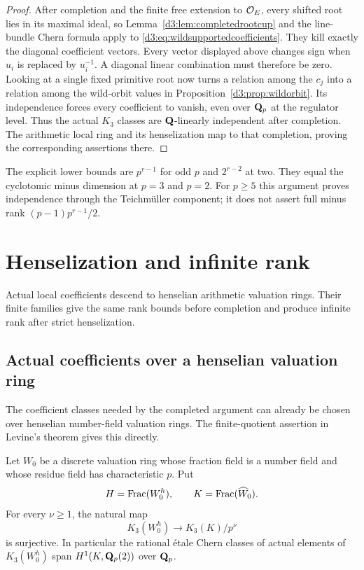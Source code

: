 \begin{proof}
After completion and the finite free extension to
$\mathcal O_E$, every shifted root lies in its maximal ideal, so
Lemma~\ref{d3:lem:completedrootcup} and the line-bundle Chern formula
apply to \eqref{d3:eq:wildsupportedcoefficients}.
They kill exactly the diagonal coefficient vectors.
Every vector displayed above changes sign when $u_i$ is replaced
by $u_i^{-1}$. A diagonal linear combination must therefore be zero.
Looking at a single fixed primitive root now turns a relation
among the $c_j$ into a relation among the wild-orbit values in
Proposition~\ref{d3:prop:wildorbit}. Its independence forces every
coefficient to vanish, even over $\mathbf Q_p$ at the regulator level.
Thus the actual $K_3$ classes are $\mathbf Q$-linearly independent after
completion. The arithmetic local ring and its henselization map
to that completion, proving the corresponding assertions there.
\end{proof}

\begin{remark}
The explicit lower bounds are $p^{r-1}$ for odd $p$ and
$2^{r-2}$ at two. They equal the cyclotomic minus dimension at
$p=3$ and $p=2$. For $p\geq5$ this argument proves independence
through the Teichm\"uller component; it does not assert full minus
rank $(p-1)p^{r-1}/2$.
\end{remark}


\section{Henselization and infinite rank}\label{d3:sec:henselian}
Actual local coefficients descend to henselian arithmetic valuation rings.
Their finite families give the same rank bounds before completion and
produce infinite rank after strict henselization.

\subsection{Actual coefficients over a henselian valuation ring}
\label{d3:sec:henselianeisenstein}

The coefficient classes needed by the completed argument can already be
chosen over henselian number-field valuation rings.  The finite-quotient
assertion in Levine's theorem gives this directly.

\begin{lemma}
\label{d3:lem:henseliancoefficients}
Let $W_0$ be a discrete valuation ring whose fraction field is a number
field and whose residue field has characteristic $p$.  Put
\[
H=\operatorname{Frac}(W_0^h),\qquad K=\operatorname{Frac}(\widehat W_0).
\]
For every $\nu\geq1$, the natural map
\[
K_3(W_0^h)\longrightarrow K_3(K)/p^\nu
\]
is surjective.  In particular the rational \'etale Chern classes of
actual elements of $K_3(W_0^h)$ span $H^1(K,\mathbf Q_p(2))$ over $\mathbf Q_p$.
\end{lemma}

